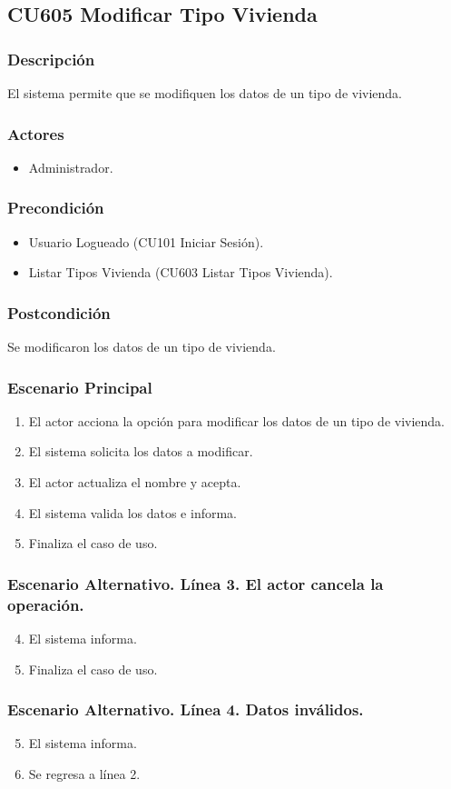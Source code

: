 \subsection{CU605 Modificar Tipo Vivienda}
\subsubsection{Descripci\'{o}n}
El sistema permite que se modifiquen los datos de un tipo de vivienda.
\subsubsection{Actores}
\begin{itemize}
\item Administrador.
\end{itemize}
\subsubsection{Precondici\'{o}n}
\begin{itemize}
\item Usuario Logueado (CU101 Iniciar Sesi\'{o}n).
\item Listar Tipos Vivienda (CU603 Listar Tipos Vivienda).
\end{itemize}
\subsubsection{Postcondici\'{o}n}
Se modificaron los datos de un tipo de vivienda.
\subsubsection{Escenario Principal}
\begin{enumerate}
\item El actor acciona la opci\'{o}n para modificar los datos de un tipo de vivienda.
\item El sistema solicita los datos a modificar.
\item El actor actualiza el nombre y acepta.
\item El sistema valida los datos e informa.
\item Finaliza el caso de uso.
\end{enumerate}
\subsubsection{Escenario Alternativo. L\'{i}nea 3. El actor cancela la operaci\'{o}n.}
\begin{enumerate}
\setcounter{enumi}{3}
\item El sistema informa.
\item Finaliza el caso de uso.
\end{enumerate}
\subsubsection{Escenario Alternativo. L\'{i}nea 4. Datos inv\'{a}lidos.}
\begin{enumerate}
\setcounter{enumi}{4}
\item El sistema informa.
\item Se regresa a l\'{i}nea 2.
\end{enumerate}
